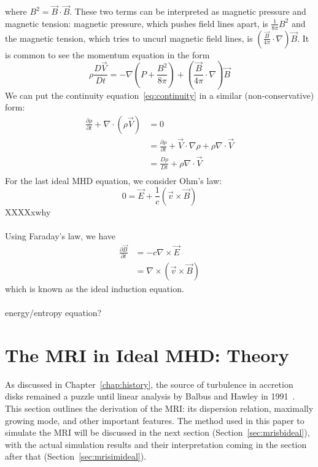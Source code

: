 where $B^2=\vec B\cdot\vec B$. These two terms can be interpreted as magnetic pressure and magnetic tension: magnetic pressure, which pushes field lines apart, is $\frac1{8\pi} B^2$ and the magnetic tension, which tries to uncurl magnetic field lines, is $(\frac{\vec B}{4\pi}\cdot\nabla)\vec B$. It is common to see the momentum equation in the form
\begin{equation}
  \rho\frac{D\vec V}{Dt}=-\nabla\left(P+\frac{B^2}{8\pi}\right)+\left(\frac{\vec B}{4\pi}\cdot\nabla\right)\vec B \label{eq:momcons2}
\end{equation}
We can put the continuity equation~\ref{eq:continuity} in a similar (non-conservative) form:
\begin{align}
  \frac{\partial\rho}{\partial t}+\nabla\cdot\left(\rho\vec V\right)&=0\\
  &=\frac{\partial\rho}{\partial t}+\vec V\cdot\nabla\rho+\rho\nabla\cdot\vec V\\
  &=\frac{D\rho}{Dt}+\rho\nabla\cdot\vec V\\
\end{align}
For the last ideal MHD equation, we consider Ohm's law:
\begin{equation}
  0=\vec E+\frac1c(\vec v\times\vec B)
\end{equation}
XXXXxwhy\\
\\Using Faraday's law, we have
\begin{align}
  \frac{\partial\vec B}{\partial t}&=-c\nabla\times\vec E\\
  &=\nabla\times\left(\vec v\times\vec B\right)
\end{align}
which is known as the ideal induction equation.\\
\\
energy/entropy equation? 

\section{The MRI in Ideal MHD: Theory}
As discussed in Chapter~\ref{chap:history}, the source of turbulence in accretion disks remained a puzzle until linear analysis by Balbus and Hawley in 1991~\cite{BH1991}. This section outlines the derivation of the MRI: its dispersion relation, maximally growing mode, and other important features. The method used in this paper to simulate the MRI will be discussed in the next section (Section~\ref{sec:mrisbideal}), with the actual simulation results and their interpretation coming in the section after that (Section~\ref{sec:mrisimideal}).

